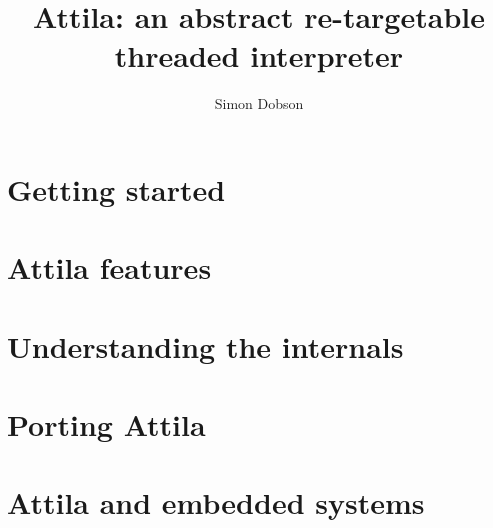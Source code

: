 \documentclass{book}
\title{Attila: an abstract re-targetable threaded interpreter}
\author{Simon Dobson}
\begin{document}
\maketitle





\part{Getting started}
\label{part:getting-started}

%


\part{Attila features}
\label{part:features}

%
%
%
%

%
%
%
%
%
%
%
%
%
%
%
%
%
%
%
 

\part{Understanding the internals}
\label{part:internals}

%
%
%


\part{Porting Attila}
\label{part:porting}




\part{Attila and embedded systems}
\label{part:embedded-systems}





\end{document}
